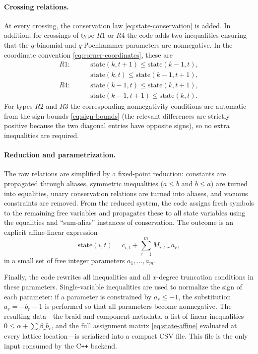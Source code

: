 \documentclass[twocolumn]{article}
\begin{document}
\paragraph{Crossing relations.}
At every crossing, the conservation law \eqref{eq:state-conservation} is added.
In addition, for crossings of type \(R1\) or \(R4\) the code adds two inequalities
ensuring that the $q$-binomial and $q$-Pochhammer parameters are nonnegative.
In the coordinate convention \eqref{eq:corner-coordinates}, these are
\begin{equation}\label{eq:r1-r4-ineq}
  \begin{aligned}
  R1:&\qquad \mathrm{state}(k,t+1)\le \mathrm{state}(k-1,t),\\
     &\qquad \mathrm{state}(k,t)\le \mathrm{state}(k-1,t+1),\\
  R4:&\qquad \mathrm{state}(k-1,t)\le \mathrm{state}(k,t+1),\\
     &\qquad \mathrm{state}(k-1,t+1)\le \mathrm{state}(k,t).
  \end{aligned}
\end{equation}
For types \(R2\) and \(R3\) the corresponding nonnegativity conditions are
automatic from the sign bounds \eqref{eq:sign-bounds} (the relevant differences
are strictly positive because the two diagonal entries have opposite signs), so
no extra inequalities are required.

\paragraph{Reduction and parametrization.}
The raw relations are simplified by a fixed-point reduction:
constants are propagated through aliases, symmetric inequalities \((a\le b\) and
\(b\le a)\) are turned into equalities, unary conservation relations are turned
into aliases, and vacuous constraints are removed.
From the reduced system, the code assigns fresh
symbols to the remaining free variables and propagates these to all state
variables using the equalities and ``sum-alias'' instances of conservation.
The outcome is an explicit affine-linear expression
\begin{equation}\label{eq:state-affine}
  \mathrm{state}(i,t)=c_{i,t}+\sum_{r=1}^m M_{i,t,r}\,a_r,
\end{equation}
in a small set of free integer parameters \(a_1,\dots,a_m\).

Finally, the code rewrites all inequalities and all $x$-degree truncation
conditions in these parameters.
Single-variable inequalities are used to normalize the sign of each parameter:
if a parameter is constrained by \(a_r\le -1\), the substitution
\(a_r=-b_r-1\) is performed so that all parameters become nonnegative.
The resulting data---the braid and component metadata, a list of linear
inequalities \(0\le \alpha+\sum \beta_r b_r\), and the full assignment
matrix \eqref{eq:state-affine} evaluated at every lattice location---is
serialized into a compact CSV file.
This file is the only input consumed by the C\texttt{++} backend.
\end{document}
